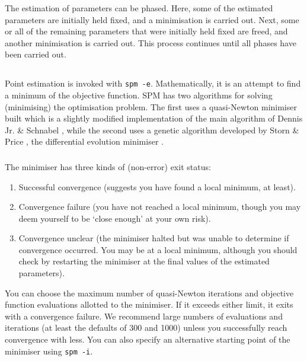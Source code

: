 The estimation of parameters can be phased. Here, some of the estimated parameters are initially held fixed, and a minimisation is carried out. Next, some or all of the remaining parameters that were initially held fixed are freed, and another minimisation is carried out. This process continues until all phases have been carried out.

\subsection{\label{sec:estimate-MPD}}

Point estimation is invoked with \texttt{spm -e}. Mathematically, it is an attempt to find a minimum of the objective function. SPM has two algorithms for solving (minimising) the optimisation problem. The first uses a quasi-Newton minimiser built which is a slightly modified implementation of the main algorithm of Dennis Jr. \& Schnabel \citep{779}, while the second uses a genetic algorithm developed by Storn \& Price \citep{1442}, the differential evolution minimiser .

\subsubsection{}

The minimiser has three kinds of (non-error) exit status: 

\begin{enumerate}
\item Successful convergence (suggests you have found a local minimum, at least).
\item Convergence failure (you have not reached a local minimum, though you may deem yourself to be `close enough' at your own risk).
\item Convergence unclear (the minimiser halted but was unable to determine if convergence occurred. You may be at a local minimum, although you should check by restarting the minimiser at the final values of the estimated parameters).
\end{enumerate}

You can choose the maximum number of quasi-Newton iterations and objective function evaluations allotted to the minimiser. If it exceeds either limit, it exits with a convergence failure. We recommend large numbers of evaluations and iterations (at least the defaults of 300 and 1000) unless you successfully reach convergence with less. You can also specify an alternative starting point of the minimiser using \texttt{spm -i}.

